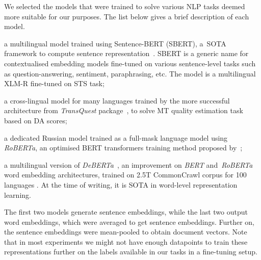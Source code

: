 We selected the models that were trained to solve various NLP tasks deemed more suitable for our purposes. The list below gives a brief description of each model. 
\label{pg:embeddings}
\begin{description}\compresslist{}
	\item[stsb-xlm-r-m:] a multilingual model trained using Sentence-BERT (SBERT), a~\gls{SOTA} framework to compute sentence representation~\cite{Reimers2019}. SBERT is a generic name for contextualised embedding models fine-tuned on various sentence-level tasks such as question-answering, sentiment, paraphrasing, etc. The model is a multilingual XLM-R fine-tuned on \gls{STS} task;
	
	\item[TQmono-m:] a cross-lingual model for many languages trained by the more successful architecture from \textit{TransQuest} package~\cite{Ranasinghe2020}, to solve MT quality estimation task based on DA scores;
	
	\item[ruRoberta:] a dedicated Russian model trained as a full-mask language model using \textit{RoBERTa}, an optimised BERT transformers training method proposed by~\citet{Liu2019};
	
	\item[mdeberta3:] a multilingual version of \textit{DeBERTa}~\cite{He2021}, an improvement on \textit{BERT} and~\textit{RoBERTa} word embedding architectures, trained on 2.5T CommonCrawl corpus for 100 languages . At the time of writing, it is \gls{SOTA} in word-level representation learning. 
\end{description}

The first two models generate sentence embeddings, while the last two output word embeddings, which were averaged to get sentence embeddings. Further on, the sentence embeddings were mean-pooled to obtain document vectors. 
Note that in most experiments we might not have enough datapoints to train these representations further on the labels available in our tasks in a fine-tuning setup. %

